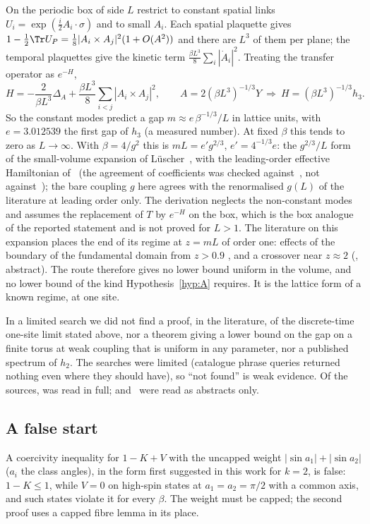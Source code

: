 On the periodic box of side $L$ restrict to constant spatial links $U_i=\exp(\tfrac{i}{2}A_i\cdot\sigma)$
and to small $A_i$. Each spatial plaquette gives $1-\tfrac12\Tr U_P=\tfrac18|A_i\times A_j|^2(1+O(A^2))$ and
there are $L^3$ of them per plane; the temporal plaquettes give the kinetic term
$\tfrac{\beta L^3}{8}\sum_i|\dot A_i|^2$. Treating the transfer operator as $e^{-H}$,
\[
H=-\frac{2}{\beta L^3}\Delta_A+\frac{\beta L^3}{8}\sum_{i<j}|A_i\times A_j|^2,
\qquad A=2(\beta L^3)^{-1/3}Y \ \Longrightarrow\ H=(\beta L^3)^{-1/3}h_3 .
\]
So the constant modes predict a gap $m\approx e\,\beta^{-1/3}/L$ in lattice units, with $e=3.012539$ the
first gap of $h_3$ (a measured number). At fixed $\beta$ this tends to zero as $L\to\infty$.
With $\beta=4/g^2$ this is $mL=e'g^{2/3}$, $e'=4^{-1/3}e$: the $g^{2/3}/L$ form of the small-volume
expansion of L\"uscher~\cite{Lu83}, with the leading-order effective Hamiltonian of~\cite[eq.~(9)]{vB00}
(the agreement of coefficients was checked against~\cite{vB00}, not against~\cite{Lu83}); the bare coupling $g$ here agrees with the
renormalised $g(L)$ of the literature at leading order only. The derivation neglects the non-constant
modes and assumes the replacement of $T$ by $e^{-H}$ on the box, which is the box analogue of the reported
statement and is not proved for $L>1$.
The literature on this expansion places the end of its regime at $z=mL$ of order one: effects of the
boundary of the fundamental domain from $z>0.9$ \cite[pp.~11--12]{vB00}, and a crossover near $z\approx2$
(\cite{LM84}, abstract). The route therefore gives no lower bound uniform in the volume, and no lower bound
of the kind Hypothesis~\ref{hyp:A} requires. It is the lattice form of a known regime, at one site.

In a limited search we did not find a proof, in the literature, of the discrete-time one-site limit stated
above, nor a theorem giving a lower bound on the gap on a finite torus at weak coupling that is uniform in
any parameter, nor a published spectrum of $h_2$. The searches were limited (catalogue phrase queries
returned nothing even where they should have), so ``not found'' is weak evidence.
Of the sources, \cite{vB00} was read in full; \cite{Lu83} and~\cite{LM84} were read as abstracts only.

\subsection{A false start}
A coercivity inequality for $1-K+V$ with the uncapped weight $|\sin a_1|+|\sin a_2|$ ($a_i$ the class
angles), in the form first suggested in this work for $k=2$, is false: $1-K\le1$, while $V=0$ on high-spin
states at $a_1=a_2=\pi/2$ with a common axis, and such states violate it for every $\beta$. The weight must be
capped; the second proof uses a capped fibre lemma in its place.
